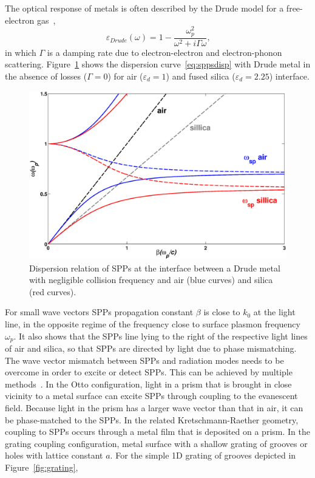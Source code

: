 The optical response of metals is often described by the Drude model for a free-electron gas~\cite{kittel1976introduction},
\begin{equation}
\varepsilon_{Drude}(\omega)=1-\frac{\omega_p^2}{\omega^2+i\Gamma\omega}\text{,}
\end{equation}
in which $\Gamma$ is a damping rate due to electron-electron and electron-phonon scattering.
Figure~\ref{fig:SPPdisp} shows the dispersion curve~\ref{eq:sppsdisp} with Drude metal  in the absence of losses ($\Gamma=0$) for air ($\varepsilon_d = 1$) and fused silica ($\varepsilon_d = 2.25$) interface.
\begin{figure}[htb]
\centering
\includegraphics[scale=0.4]{THM/SPPdisp.eps}
\caption{\label{fig:SPPdisp}Dispersion relation of SPPs at the interface between a Drude metal with negligible collision frequency and air (blue curves) and silica (red curves).}
\end{figure}
For small wave vectors SPPs propagation constant $\beta$ is close to $k_0$ at the light line, in the opposite regime of the frequency close to surface plasmon frequency $\omega_p$. It also shows that the SPPs line lying to the right of the respective light lines of air and silica, so that SPPs are directed by light due to phase mismatching. The wave vector mismatch between SPPs and radiation modes needs to be overcome in order to excite or detect SPPs. This can be achieved by multiple methods~\cite{raether1988surface}. In the Otto configuration, light in a prism that is brought in close vicinity to a metal surface can excite SPPs through coupling to the evanescent field. Because light in the prism has a larger wave vector than that in air, it can be phase-matched to the SPPs. In the related Kretschmann-Raether geometry, coupling to SPPs occurs through a metal film that is deposited on a prism. In the grating coupling configuration, metal surface with a shallow grating of grooves or holes with lattice constant $a$. For the simple 1D grating of grooves depicted in Figure~\ref{fig:grating},

